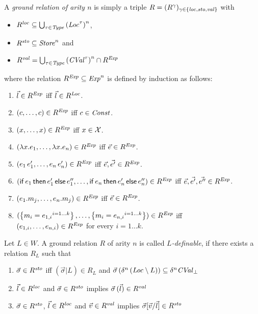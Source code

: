 \documentclass[12pt,a4paper]{report}
\newcommand{\CVal}{\nstyle{CVal}}
\newcommand{\loc}{\nstyle{loc}}
\newcommand{\sto}{\nstyle{sto}}
\newcommand{\val}{\nstyle{val}}
\begin{document}
\begin{definition}
  A {\em ground relation of arity $n$} is simply a triple $R = (R^\gamma)_{\gamma\in\{\loc,\sto,\val\}}$ with
  \begin{itemize}
    \item $R^\loc \subseteq \bigcup_{\tau\in\Type} \left(\Loc^\tau\right)^n$,
    \item $R^\sto \subseteq \Store^n$ and
    \item $R^\val = \bigcup_{\tau\in\Type} \left(\CVal^\tau\right)^n \cap R^\Exp$
  \end{itemize}
  where the relation $R^{\mathit{Exp}} \subseteq \mathit{Exp}^n$ is defined by induction as follows:
  \begin{enumerate}
    \item $\vec{l}\in R^{\mathit{Exp}}$ iff $\vec{l}\in R^{\mathit{Loc}}$.
    \item $(c,\ldots,c)\in R^{\mathit{Exp}}$ iff $c\in\mathit{Const}$.
    \item $(x,\ldots,x)\in R^{\mathit{Exp}}$ iff $x\in\mathcal{X}$.
    \item $(\lambda x.e_1,\ldots,\lambda x.e_n)\in R^{\mathit{Exp}}$ iff $\vec{e}\in R^{\mathit{Exp}}$.
    \item $(e_1\,e_1',\ldots,e_n\,e_n')\in R^{\mathit{Exp}}$ iff $\vec{e},\vec{e'}\in R^{\mathit{Exp}}$.
    \item $(\mathsf{if}\,e_1\,\mathsf{then}\,e_1'\,\mathsf{else}\,e_1'',\ldots,\mathsf{if}\,e_n\,\mathsf{then}\,e_n'\,\mathsf{else}\,e_n'')\in R^{\mathit{Exp}}$ iff
          $\vec{e},\vec{e'},\vec{e''}\in R^{\mathit{Exp}}$.
    \item $(e_1.m_j,\ldots,e_n.m_j)\in R^{\mathit{Exp}}$ iff $\vec{e}\in R^{\mathit{Exp}}$.
    \item $(\left\{{m_i=e_{1,i}}^{i=1 \ldots k}\right\},\ldots,\left\{{m_i=e_{n,i}}^{i=1 \ldots k}\right\})\in R^{\mathit{Exp}}$ iff \\
            $(e_{1,i},\ldots,e_{n,i})\in R^{\mathit{Exp}}$ for every $i=1 \ldots k$.
  \end{enumerate}
\end{definition}

\begin{definition}[$L$-definability]
  Let $L \in W$. A ground relation $R$ of arity $n$ is called {\em $L$-definable}, if there
  exists a relation $R_L$ such that
  \begin{enumerate}
    \item $\vec{\sigma}\in R^\sto$ iff $(\vec{\sigma}|L) \in R_L$ and
          $\vec{\sigma}\,(\delta^n\,(\Loc \setminus L)) \subseteq \delta^n \CVal_\bot$
    \item $\vec{l}\in R^\loc$ and $\vec{\sigma}\in R^\sto$ implies $\vec{\sigma}\,(\vec{l})\in R^\val$
    \item $\vec{\sigma}\in R^\sto$, $\vec{l}\in R^\loc$ and $\vec{v}\in R^\val$ implies
          $\vec{\sigma}[\vec{v}/\vec{l}]\in R^\sto$
  \end{enumerate}
\end{definition}
\end{document}
